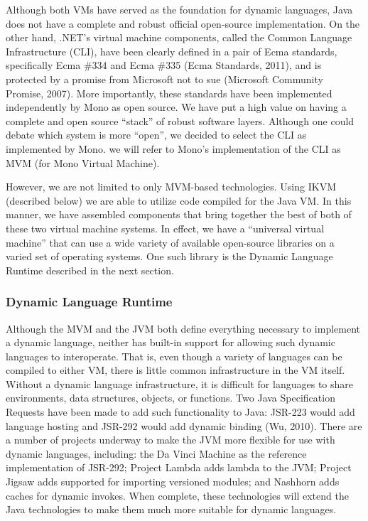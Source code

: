\documentclass[preprint]{sigplanconf}
\begin{document}
Although both VMs have served as the foundation for dynamic languages,
Java does not have a complete and robust official open-source
implementation. On the other hand, .NET’s virtual machine components,
called the Common Language Infrastructure (CLI), have been clearly
defined in a pair of Ecma standards, specifically Ecma \#334 and Ecma
\#335 (Ecma Standards, 2011), and is protected by a promise from
Microsoft not to sue (Microsoft Community Promise, 2007). More
importantly, these standards have been implemented independently by
Mono as open source. We have put a high value on having a complete and
open source ``stack'' of robust software layers. Although one could
debate which system is more ``open'', we decided to select the CLI as
implemented by Mono. we will refer to Mono's implementation of the CLI
as MVM (for Mono Virtual Machine).

However, we are not limited to only MVM-based technologies. Using IKVM
(described below) we are able to utilize code compiled for the Java
VM. In this manner, we have assembled components that bring together
the best of both of these two virtual machine systems. In effect, we
have a ``universal virtual machine'' that can use a wide variety of
available open-source libraries on a varied set of operating
systems. One such library is the Dynamic Language Runtime described in
the next section.

\subsubsection{Dynamic Language Runtime}

Although the MVM and the JVM both define everything necessary to
implement a dynamic language, neither has built-in support for
allowing such dynamic languages to interoperate. That is, even though
a variety of languages can be compiled to either VM, there is little
common infrastructure in the VM itself. Without a dynamic language
infrastructure, it is difficult for languages to share environments,
data structures, objects, or functions. Two Java Specification
Requests have been made to add such functionality to Java: JSR-223
would add language hosting and JSR-292 would add dynamic binding (Wu,
2010). There are a number of projects underway to make the JVM more
flexible for use with dynamic languages, including: the Da Vinci
Machine as the reference implementation of JSR-292; Project Lambda
adds lambda to the JVM; Project Jigsaw adds supported for importing
versioned modules; and Nashhorn adds caches for dynamic invokes. When
complete, these technologies will extend the Java technologies to make
them much more suitable for dynamic languages.
\end{document}
